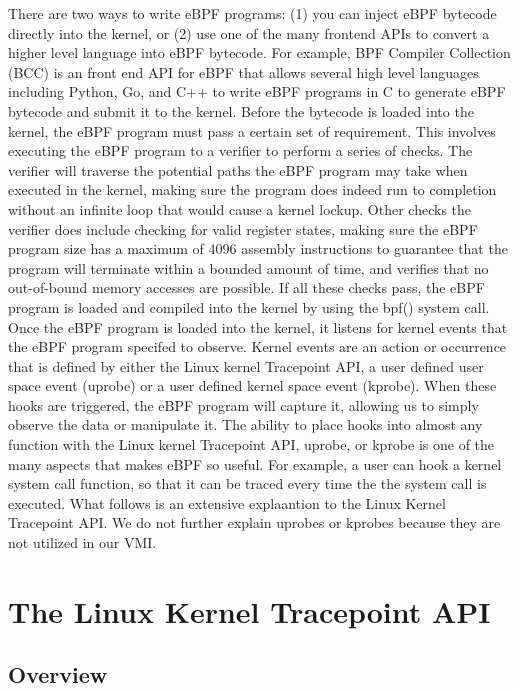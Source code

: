\documentclass{report}
\begin{document}
\begin{spacing}{1.5}
{\large
There are two ways to write eBPF programs: (1) you can inject eBPF bytecode directly into the kernel, or (2) use one of the many frontend APIs to convert a higher level language into eBPF bytecode. For example, BPF Compiler Collection (BCC) is an front end API for eBPF that allows several high level languages including Python, Go, and C++ to write eBPF programs in C to generate eBPF bytecode and submit it to the kernel. Before the bytecode is loaded into the kernel, the eBPF program must pass a certain set of requirement. This involves executing the eBPF program to a verifier to perform a series of checks. The verifier will traverse the potential paths the eBPF program may take when executed in the kernel, making sure the program does indeed run to completion without an infinite loop that would cause a kernel lockup. Other checks the verifier does include checking for valid register states, making sure the eBPF program size has a maximum of 4096 assembly instructions to guarantee that the program will terminate within a bounded amount of time, and verifies that no out-of-bound memory accesses are possible. If all these checks pass, the eBPF program is loaded and compiled into the kernel by using the bpf() system call. Once the eBPF program is loaded into the kernel, it listens for kernel events that the eBPF program specifed to observe. Kernel events are an action or occurrence that is defined by either the Linux kernel Tracepoint API, a user defined user space event (uprobe) or a user defined kernel space event (kprobe). When these hooks are triggered, the eBPF program will capture it, allowing us to simply observe the data or manipulate it. The ability to place hooks into almost any function with the Linux kernel Tracepoint API, uprobe, or kprobe is one of the many aspects that makes eBPF so useful. For example, a user can hook a kernel system call function, so that it can be traced every time the the system call is executed. What follows is an extensive explaantion to the Linux Kernel Tracepoint API. We do not further explain uprobes or kprobes because they are not utilized in our VMI.
\newline
}




\section{The Linux Kernel Tracepoint API}

\subsection{Overview}


\end{spacing}
\end{document}
